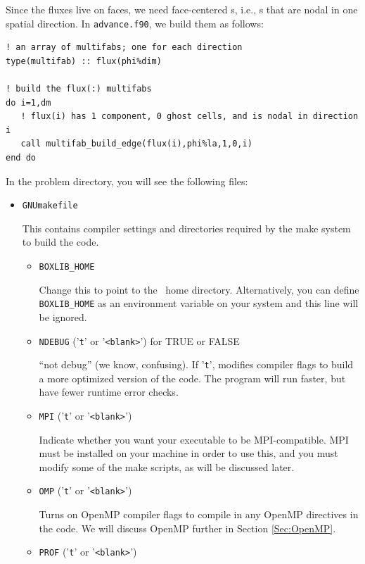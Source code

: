 Since the fluxes live on faces, we need face-centered \MultiFab s, i.e.,
\MultiFab s that are nodal in one spatial direction.  In {\tt advance.f90},
we build them as follows:
\begin{lstlisting}[backgroundcolor=\color{light-green}]
! an array of multifabs; one for each direction
type(multifab) :: flux(phi%dim) 

! build the flux(:) multifabs
do i=1,dm
   ! flux(i) has 1 component, 0 ghost cells, and is nodal in direction i
   call multifab_build_edge(flux(i),phi%la,1,0,i)
end do
\end{lstlisting}

In the problem directory, you will see the following files:
\begin{itemize}
\item {\tt GNUmakefile}

This contains compiler settings and directories required by the make system to build the code.

  \begin{itemize}

    \item {\tt BOXLIB\_HOME}

    Change this to point to the \BoxLib\ home directory.  Alternatively, you can define {\tt BOXLIB\_HOME}
    as an environment variable on your system and this line will be ignored.

    \item {\tt NDEBUG} ('{\tt t}' or '{\tt <blank>}') for TRUE or FALSE
      
    ``not debug'' (we know, confusing).  If '{\tt t}', modifies compiler flags to build a 
    more optimized version of the code.  The program will run faster, but have fewer 
    runtime error checks.

    \item {\tt MPI} ('{\tt t}' or '{\tt <blank>}')

    Indicate whether you want your executable to be MPI-compatible.  MPI must be installed on your
    machine in order to use this, and you must modify some of the make scripts, as will be 
    discussed later.

    \item {\tt OMP} ('{\tt t}' or '{\tt <blank>}')

    Turns on OpenMP compiler flags to compile in any OpenMP directives in the code.
    We will discuss OpenMP further in Section \ref{Sec:OpenMP}.

    \item {\tt PROF} ('{\tt t}' or '{\tt <blank>}')


\end{itemize}
\end{itemize}
